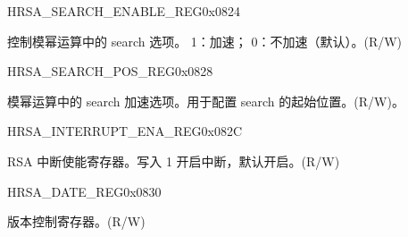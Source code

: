\begin{register}{H}{RSA\_SEARCH\_ENABLE\_REG}{0x{}0824}\label{regdesc:RSASEARCHENABLEREG}
%
%
\regnewline%
\begin{regdesc}\begin{reglist}
\item [RSA\_SEARCH\_ENABLE] 控制模幂运算中的 search 选项。
1：加速；
0：不加速（默认）。(R/W)
\end{reglist}\end{regdesc}
\end{register}



\begin{register}{H}{RSA\_SEARCH\_POS\_REG}{0x{}0828}\label{regdesc:RSASEARCHPOSREG}
%
%
\regnewline%
\begin{regdesc}\begin{reglist}
\item [RSA\_SEARCH\_POS] 模幂运算中的 search 加速选项。用于配置 search 的起始位置。(R/W)。
\end{reglist}\end{regdesc}
\end{register}


\begin{register}{H}{RSA\_INTERRUPT\_ENA\_REG}{0x{}082C}\label{regdesc:RSAINTERRUPTENAREG}
%
%
\regnewline%
\begin{regdesc}\begin{reglist}
\item [RSA\_INTERRUPT\_ENA] RSA 中断使能寄存器。写入 1 开启中断，默认开启。(R/W)
\end{reglist}\end{regdesc}
\end{register}


\begin{register}{H}{RSA\_DATE\_REG}{0x{}0830}\label{regdesc:RSADATEREG}
%
%
\regnewline%
\begin{regdesc}\begin{reglist}
\item [RSA\_DATE] 版本控制寄存器。(R/W)
\end{reglist}\end{regdesc}
\end{register}